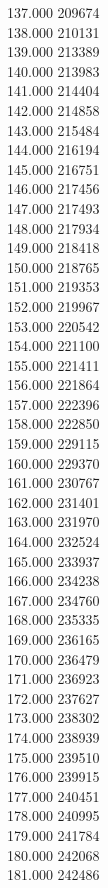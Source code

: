 { 137.000	209674 \\
 138.000	210131 \\
 139.000	213389 \\
 140.000	213983 \\
 141.000	214404 \\
 142.000	214858 \\
 143.000	215484 \\
 144.000	216194 \\
 145.000	216751 \\
 146.000	217456 \\
 147.000	217493 \\
 148.000	217934 \\
 149.000	218418 \\
 150.000	218765 \\
 151.000	219353 \\
 152.000	219967 \\
 153.000	220542 \\
 154.000	221100 \\
 155.000	221411 \\
 156.000	221864 \\
 157.000	222396 \\
 158.000	222850 \\
 159.000	229115 \\
 160.000	229370 \\
 161.000	230767 \\
 162.000	231401 \\
 163.000	231970 \\
 164.000	232524 \\
 165.000	233937 \\
 166.000	234238 \\
 167.000	234760 \\
 168.000	235335 \\
 169.000	236165 \\
 170.000	236479 \\
 171.000	236923 \\
 172.000	237627 \\
 173.000	238302 \\
 174.000	238939 \\
 175.000	239510 \\
 176.000	239915 \\
 177.000	240451 \\
 178.000	240995 \\
 179.000	241784 \\
 180.000	242068 \\
 181.000	242486 \\
}
